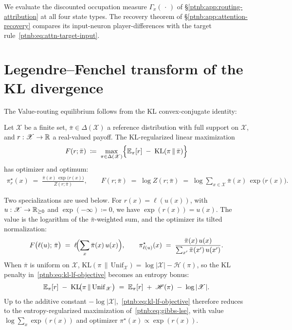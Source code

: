 We evaluate the discounted occupation measure $\Gamma_x(\,\cdot\,)$ of
\S\ref{ptnb:app:routing-attribution} at all four state types.
The recovery theorem of \S\ref{ptnb:app:attention-recovery} compares its input-neuron
player-differences with the target rule~\eqref{ptnb:eq:attn-target-input}.

\section{Legendre--Fenchel transform of the KL divergence}\label{ptnb:app:kl-legendre-fenchel}

The Value-routing equilibrium follows from the KL convex-conjugate identity:

\begin{lemmaenv}\label{ptnb:lem:kl-legendre-fenchel}
Let $\mathcal{X}$ be a finite set, $\bar\pi \in \Delta(\mathcal{X})$ a reference distribution with
full support on $\mathcal{X}$, and $r : \mathscr{X} \to \mathbb{R}$ a real-valued payoff. The
KL-regularized linear maximization
\begin{align}\label{ptnb:eq:kl-lf-objective}
    F(r;\bar\pi) \;\coloneqq\; \max_{\pi \in \Delta(\mathscr{X})}
    \Bigl\{ \mathbb{E}_\pi[r] \;-\; \mathrm{KL}(\pi \,\|\, \bar\pi) \Bigr\}
\end{align}
has optimizer and optimum:
\begin{align}\label{ptnb:eq:kl-lf-optimizer}
    \pi_r^\star(x) \;=\; \frac{\bar\pi(x)\,\exp\!\bigl(r(x)\bigr)}{Z(r;\bar\pi)},
    \qquad
    F(r;\bar\pi) \;=\; \log Z(r;\bar\pi) \;=\; \log\!\sum_{x \in \mathcal{X}}
    \bar\pi(x)\,\exp\!\bigl(r(x)\bigr).
\end{align}\end{lemmaenv}

Two specializations are used below. For $r(x) = \ell(u(x))$, with
$u : \mathscr{X} \to \mathbb{R}_{\geq 0}$ and $\exp(-\infty) \coloneqq 0$, we have $\exp(r(x)) = u(x)$.
The value is the logarithm of the $\bar\pi$-weighted sum, and the optimizer its tilted normalization:
\begin{align}\label{ptnb:eq:kl-lf-linearized}
    F\bigl(\ell(u);\,\bar\pi\bigr) \;=\; \ell\!\Bigl(\sum_{x}\bar\pi(x)\,u(x)\Bigr),
    \qquad
    \pi_{\ell(u)}^\star(x) \;=\; \frac{\bar\pi(x)\,u(x)}{\sum_{x'}\bar\pi(x')\,u(x')}.
\end{align}
When $\bar\pi$ is uniform on $\mathcal{X}$, $\mathrm{KL}(\pi\,\|\,\mathrm{Unif}_\mathcal{X}) =
    \log|\mathcal{X}| - \mathcal{H}(\pi)$, so the KL penalty in~\eqref{ptnb:eq:kl-lf-objective}
becomes an entropy bonus:
\begin{align}
    \mathbb{E}_\pi[r] \;-\; \mathrm{KL}\!\bigl(\pi\,\|\,\mathrm{Unif}_\mathscr{X}\bigr)
    \;=\; \mathbb{E}_\pi[r] \;+\; \mathscr{H}(\pi) \;-\; \log|\mathscr{X}|.
\end{align}
Up to the additive constant $-\log|\mathcal{X}|$,~\eqref{ptnb:eq:kl-lf-objective} therefore reduces to
the entropy-regularized maximization of~\eqref{ptnb:eq:gibbs-lse}, with value $\log\sum_{x}\exp(r(x))$
and optimizer $\pi^\star(x) \propto \exp(r(x))$.

